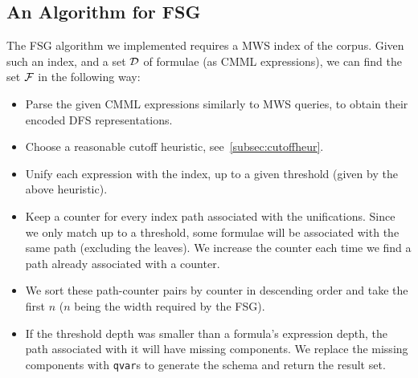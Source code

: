 \documentclass[a4paper,11pt,oneside]{article}
\def\MWS{\textsf{MWS}\xspace}
\begin{document}
\subsection{An Algorithm for FSG}\label{subsec:fsgAlgorithm}
The FSG algorithm we implemented requires a \MWS index of the corpus.
Given such an index, and a set $\mathcal{D}$ of formulae (as CMML expressions),
we can find the set $\mathcal{F}$ in the following way:
\begin{itemize}
    \item Parse the given CMML expressions similarly to \MWS queries,
        to obtain their encoded DFS representations.
    \item Choose a reasonable cutoff heuristic, see~\ref{subsec:cutoffheur}.
    \item Unify each expression with the index, up to a given threshold (given by
        the above heuristic).
    \item Keep a counter for every index path associated with the unifications.
        Since we only match up to a threshold, some formulae will be associated
        with the same path (excluding the leaves).
        We increase the counter each time we find a path already associated
        with a counter.
    \item We sort these path-counter pairs by counter in descending order and
        take the first $n$ ($n$ being the width required by the FSG).
    \item If the threshold depth was smaller than a formula's expression
        depth, the path associated with it will have missing components. We
        replace the missing components with \lstinline|qvar|s to generate the
        schema and return the result set.
\end{itemize}
\end{document}
